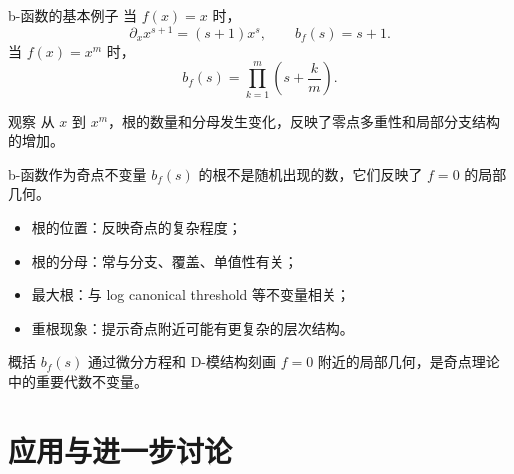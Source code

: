\documentclass[aspectratio=169,11pt]{ctexbeamer}
\begin{document}
\begin{frame}{b-函数的基本例子}
    当 $f(x)=x$ 时，
    \[
        \partial_x x^{s+1}=(s+1)x^s,
        \qquad b_f(s)=s+1.
    \]
    \pause
    \vspace{0.6em}
    当 $f(x)=x^m$ 时，
    \[
        b_f(s)=\prod_{k=1}^m\left(s+\frac{k}{m}\right).
    \]
    \pause
    \begin{block}{观察}
        从 $x$ 到 $x^m$，根的数量和分母发生变化，反映了零点多重性和局部分支结构的增加。
    \end{block}

\end{frame}

\begin{frame}{b-函数作为奇点不变量}
    $b_f(s)$ 的根不是随机出现的数，它们反映了 $f=0$ 的局部几何。

    \begin{itemize}
        \item 根的位置：反映奇点的复杂程度；
        \item 根的分母：常与分支、覆盖、单值性有关；
        \item 最大根：与 log canonical threshold 等不变量相关；
        \item 重根现象：提示奇点附近可能有更复杂的层次结构。
    \end{itemize}

    \vspace{0.8em}
    \begin{block}{概括}
        $b_f(s)$ 通过微分方程和 D-模结构刻画 $f=0$ 附近的局部几何，是奇点理论中的重要代数不变量。
    \end{block}

\end{frame}



\section{应用与进一步讨论}
\end{document}
